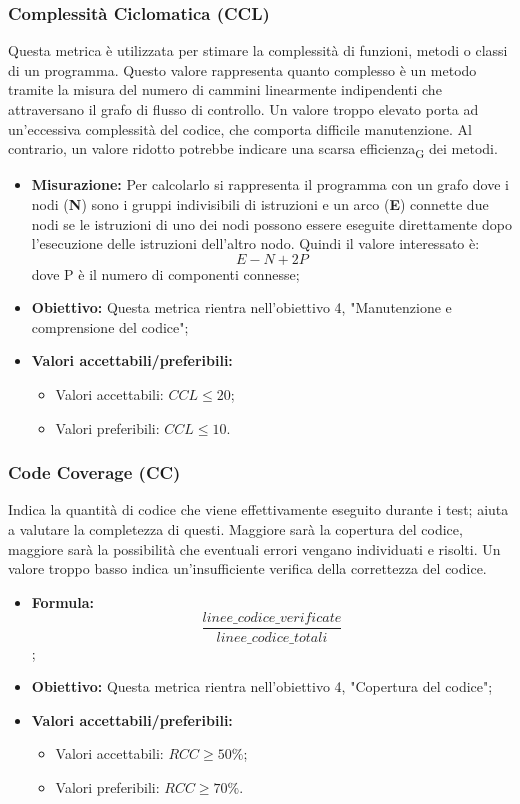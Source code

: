 \subsubsection{Complessità Ciclomatica (CCL)}
Questa metrica è utilizzata per stimare la complessità di funzioni, metodi o classi di un programma. Questo valore rappresenta quanto complesso è un metodo tramite la misura del numero di cammini linearmente indipendenti che attraversano il grafo di flusso di controllo. Un valore troppo elevato porta ad un'eccessiva complessità del codice, che comporta difficile manutenzione. Al contrario, un valore ridotto potrebbe indicare una scarsa efficienza\textsubscript{G} dei metodi.
\begin{itemize}
	\item \textbf{Misurazione:}  Per calcolarlo si rappresenta il programma con un grafo dove i  nodi (\textbf{N}) sono i gruppi indivisibili di istruzioni e un arco (\textbf{E}) connette due nodi se le istruzioni di uno dei nodi possono essere eseguite direttamente dopo l'esecuzione delle istruzioni dell'altro nodo. Quindi il valore interessato è:
	\[E-N+2P\]
	dove P è il numero di componenti connesse;
	\item \textbf{Obiettivo:} Questa metrica rientra nell'obiettivo 4, "Manutenzione e comprensione del codice";
	\item \textbf{Valori accettabili/preferibili: }
	\begin{itemize}
		\item Valori accettabili: $CCL \leq 20$;
		\item Valori preferibili: $CCL \leq 10$.
	\end{itemize}
\end{itemize}
\subsubsection{Code Coverage (CC)}
Indica la quantità di codice che viene effettivamente eseguito durante i test; aiuta a valutare la completezza di questi. Maggiore sarà la copertura del codice, maggiore sarà la possibilità che eventuali errori vengano individuati e risolti. Un valore troppo basso indica un'insufficiente verifica della correttezza del codice.
\begin{itemize}
	\item \textbf{Formula:} \[\frac{linee\_codice\_verificate}{linee\_codice\_totali}\];
	\item \textbf{Obiettivo:} Questa metrica rientra nell'obiettivo 4, "Copertura del codice";
	\item \textbf{Valori accettabili/preferibili: }
	\begin{itemize}
		\item Valori accettabili: $RCC \geq 50\%$;
		\item Valori preferibili: $RCC \geq 70\%$.
	\end{itemize}
\end{itemize}


